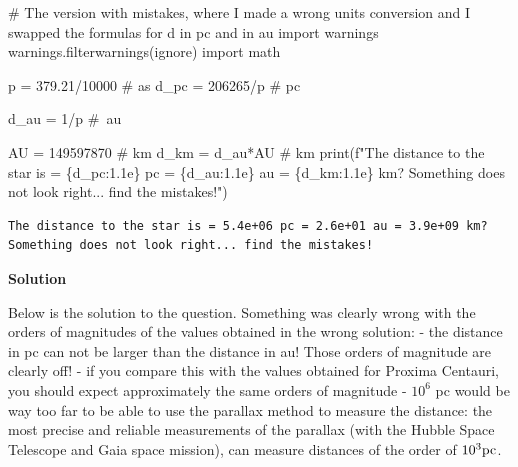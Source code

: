 \documentclass[
  letterpaper,
  DIV=11,
  numbers=noendperiod]{scrreprt}
\newenvironment{Shaded}{\begin{snugshade}}{\end{snugshade}}
\newcommand{\BuiltInTok}[1]{\textcolor[rgb]{0.00,0.23,0.31}{#1}}
\newcommand{\CommentTok}[1]{\textcolor[rgb]{0.37,0.37,0.37}{#1}}
\newcommand{\DecValTok}[1]{\textcolor[rgb]{0.68,0.00,0.00}{#1}}
\newcommand{\FloatTok}[1]{\textcolor[rgb]{0.68,0.00,0.00}{#1}}
\newcommand{\ImportTok}[1]{\textcolor[rgb]{0.00,0.46,0.62}{#1}}
\newcommand{\NormalTok}[1]{\textcolor[rgb]{0.00,0.23,0.31}{#1}}
\newcommand{\OperatorTok}[1]{\textcolor[rgb]{0.37,0.37,0.37}{#1}}
\newcommand{\SpecialCharTok}[1]{\textcolor[rgb]{0.37,0.37,0.37}{#1}}
\newcommand{\SpecialStringTok}[1]{\textcolor[rgb]{0.13,0.47,0.30}{#1}}
\newcommand{\StringTok}[1]{\textcolor[rgb]{0.13,0.47,0.30}{#1}}
\begin{document}
\begin{Shaded}
\begin{Highlighting}[]
\CommentTok{\# The version with mistakes, where I made a wrong units conversion and I swapped the formulas for d in pc and in au}
\ImportTok{import}\NormalTok{ warnings}
\NormalTok{warnings.filterwarnings(}\StringTok{\textquotesingle{}ignore\textquotesingle{}}\NormalTok{)}
\ImportTok{import}\NormalTok{ math}

\NormalTok{p }\OperatorTok{=} \FloatTok{379.21}\OperatorTok{/}\DecValTok{10000} \CommentTok{\# as }
\NormalTok{d\_pc }\OperatorTok{=} \DecValTok{206265}\OperatorTok{/}\NormalTok{p }\CommentTok{\# pc}

\NormalTok{d\_au }\OperatorTok{=} \DecValTok{1}\OperatorTok{/}\NormalTok{p }\CommentTok{\# au}

\NormalTok{AU }\OperatorTok{=} \DecValTok{149597870} \CommentTok{\# km}
\NormalTok{d\_km }\OperatorTok{=}\NormalTok{ d\_au}\OperatorTok{*}\NormalTok{AU }\CommentTok{\# km}
\BuiltInTok{print}\NormalTok{(}\SpecialStringTok{f"The distance to the star is = }\SpecialCharTok{\{}\NormalTok{d\_pc}\SpecialCharTok{:1.1e\}}\SpecialStringTok{ pc = }\SpecialCharTok{\{}\NormalTok{d\_au}\SpecialCharTok{:1.1e\}}\SpecialStringTok{ au = }\SpecialCharTok{\{}\NormalTok{d\_km}\SpecialCharTok{:1.1e\}}\SpecialStringTok{ km? Something does not look right... find the mistakes!"}\NormalTok{)}
\end{Highlighting}
\end{Shaded}

\begin{verbatim}
The distance to the star is = 5.4e+06 pc = 2.6e+01 au = 3.9e+09 km? Something does not look right... find the mistakes!
\end{verbatim}

\textbf{Solution}

Below is the solution to the question. Something was clearly wrong with
the orders of magnitudes of the values obtained in the wrong solution: -
the distance in pc can not be larger than the distance in au! Those
orders of magnitude are clearly off! - if you compare this with the
values obtained for Proxima Centauri, you should expect approximately
the same orders of magnitude - \(10^6\) pc would be way too far to be
able to use the parallax method to measure the distance: the most
precise and reliable measurements of the parallax (with the Hubble Space
Telescope and Gaia space mission), can measure distances of the order of
\(10^3\rm{pc}\).
\end{document}
